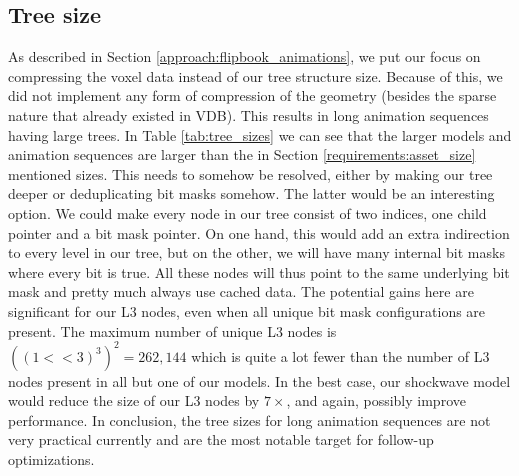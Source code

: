 \subsection{Tree size} \label{results:tree_size}
As described in Section \ref{approach:flipbook_animations}, we put our focus on compressing the voxel data instead of our tree structure size. Because of this, we did not implement any form of compression of the geometry (besides the sparse nature that already existed in VDB). This results in long animation sequences having large trees. In Table \ref{tab:tree_sizes} we can see that the larger models and animation sequences are larger than the in Section \ref{requirements:asset_size} mentioned sizes. This needs to somehow be resolved, either by making our tree deeper or deduplicating bit masks somehow. The latter would be an interesting option. We could make every node in our tree consist of two indices, one child pointer and a bit mask pointer. On one hand, this would add an extra indirection to every level in our tree, but on the other, we will have many internal bit masks where every bit is true. All these nodes will thus point to the same underlying bit mask and pretty much always use cached data. The potential gains here are significant for our L3 nodes, even when all unique bit mask configurations are present. The maximum number of unique L3 nodes is $((1<<3)^3)^2 = 262,144$ which is quite a lot fewer than the number of L3 nodes present in all but one of our models. In the best case, our shockwave model would reduce the size of our L3 nodes by $7\times$, and again, possibly improve performance. In conclusion, the tree sizes for long animation sequences are not very practical currently and are the most notable target for follow-up optimizations.

